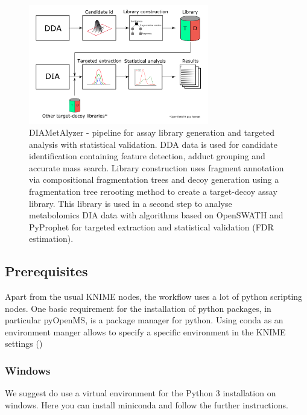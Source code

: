 \begin{figure}[!t]
  \centering
  \includegraphics[width=0.7\textwidth]{graphics/openswathmetabo/pipeline_overview.png}
  \caption{DIAMetAlyzer - pipeline for assay library generation and targeted analysis with statistical validation. DDA data is used for candidate identification containing feature detection, adduct grouping and accurate mass search. Library construction uses fragment annotation via compositional fragmentation trees and decoy generation using a fragmentation tree rerooting method to create a target-decoy assay library. This library is used in a second step to analyse metabolomics DIA data with algorithms based on OpenSWATH and PyProphet for targeted extraction and statistical validation (FDR estimation).}
  \label{fig:pipline_overview}
\end{figure}


\subsection{Prerequisites}
Apart from the usual KNIME nodes, the workflow uses a lot of python scripting nodes. One basic requirement for the installation of python packages, in particular pyOpenMS, is a package manager for python. Using conda as an environment manger allows to specify a specific environment in the KNIME settings ()

\subsubsection{Windows}
We suggest do use a virtual environment for the Python 3 installation on windows. 
Here you can install miniconda and follow the further instructions. \\

